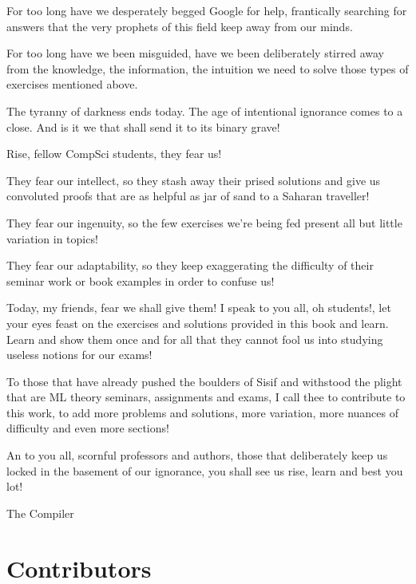 \documentclass{article}
\newcommand{\<}{\langle}
\renewcommand{\>}{\rangle}
\theoremstyle{definition}
\begin{document}
For too long have we desperately begged Google for help, frantically searching for answers that the very prophets of this field keep away from our minds.

For too long have we been misguided, have we been deliberately stirred away from the knowledge, the information, the intuition we need to solve those types of exercises mentioned above.

\vspace{1mm}

The tyranny of darkness ends today. The age of intentional ignorance comes to a close. And is it we that shall send it to its binary grave!

Rise, fellow CompSci students, they fear us! 

They fear our intellect, so they stash away their prised solutions and give us convoluted proofs that are as helpful as jar of sand to a Saharan traveller!

They fear our ingenuity, so the few exercises we're being fed present all but little variation in topics!

They fear our adaptability, so they keep exaggerating the difficulty of their seminar work or book examples in order to confuse us!

\vspace{3mm}

Today, my friends, fear we shall give them! I speak to you all, oh students!, let your eyes feast on the exercises and solutions provided in this book and learn. Learn and show them once and for all that they cannot fool us into studying useless notions for our exams!

To those that have already pushed the boulders of Sisif and withstood the plight that are ML theory seminars, assignments and exams, I call thee to contribute to this work, to add more problems and solutions, more variation, more nuances of difficulty and even more sections!

\vspace{1mm}

An to you all, scornful professors and authors, those that deliberately keep us locked in the basement of our ignorance, you shall see us rise, learn and best you lot!

\vspace{3mm}

\hspace{9cm} The Compiler

\newpage

\section*{Contributors}
\end{document}
